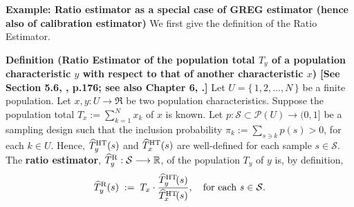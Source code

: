 \documentclass{article}
\begin{document}
\vskip 0.5cm
\noindent
\textbf{Example: Ratio estimator as a special case of GREG estimator (hence also of calibration estimator)}
\vskip 0.3cm
\noindent
We first give the definition of the Ratio Estimator.
\vskip 0.3cm
\begin{center}
\begin{minipage}{6.0in}
\noindent
\textbf{Definition 
(Ratio Estimator of the population total $T_{y}$ of a population characteristic $y$ with respect to that of another characteristic $x$)
[See Section 5.6, \cite{Sarndal1992}, p.176; see also Chapter 6, \cite{Cochran1977}.]}
\vskip 0.1cm
Let $U = \{\,1,2,\ldots,N\,\}$ be a finite population.
Let $x, y : U \longrightarrow \Re$ be two population characteristics.
Suppose the population total $T_{x} := \sum_{k=1}^{N}x_{k}$ of $x$ is known.
Let $p : \mathcal{S} \subset \mathcal{P}(U) \longrightarrow (0,1]$ be a sampling design
such that the inclusion probability $\pi_{k} := \sum_{s \ni k}p(s) > 0$, for each $k \in U$.
Hence, $\widehat{T}^{\textnormal{HT}}_{y}(s)$ and $\widehat{T}^{\textnormal{HT}}_{x}(s)$ are well-defined for each sample $s \in \mathcal{S}$.
The \textbf{ratio estimator}, $\widehat{T}^{\textnormal{R}}_{y} : \mathcal{S} \longrightarrow \Re$, of the population $T_{y}$ of $y$ is, by definition,
\begin{equation*}
\widehat{T}^{\textnormal{R}}_{y}(s)
\;:=\;
T_{x}\cdot\dfrac{\widehat{T}^{\textnormal{HT}}_{y}\!(s)}{\widehat{T}^{\textnormal{HT}}_{x}\!(s)},
\quad
\textnormal{for each $s \in \mathcal{S}$}.
\end{equation*}
\end{minipage}
\end{center}
\end{document}
